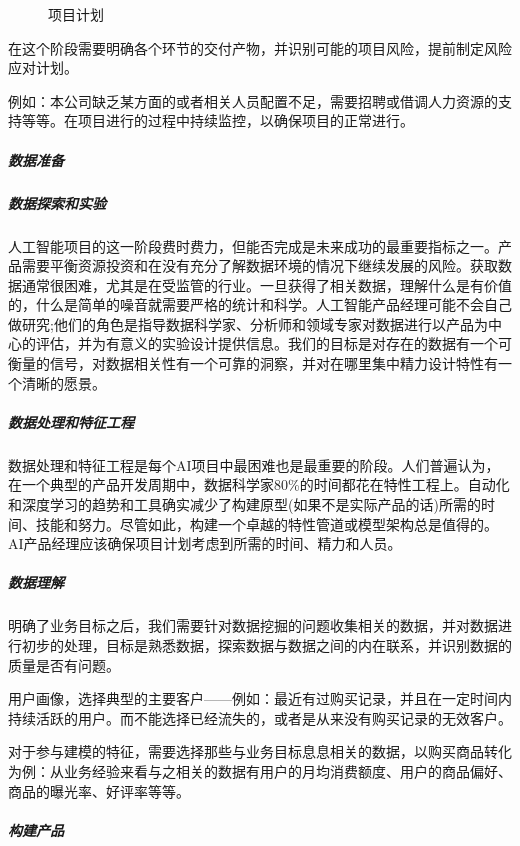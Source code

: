 \documentclass[letterpaper,11pt,english]{sphinxmanual}
\begin{document}
\begin{figure}[H]
\centering
\capstart

\noindent{}
\caption{项目计划}\label{\detokenize{chapter_project/process:id37}}\end{figure}

在这个阶段需要明确各个环节的交付产物，并识别可能的项目风险，提前制定风险应对计划。

例如：本公司缺乏某方面的或者相关人员配置不足，需要招聘或借调人力资源的支持等等。在项目进行的过程中持续监控，以确保项目的正常进行。


\subparagraph{数据准备}
\label{\detokenize{chapter_project/process:id18}}

\subparagraph{数据探索和实验}
\label{\detokenize{chapter_project/process:id19}}
人工智能项目的这一阶段费时费力，但能否完成是未来成功的最重要指标之一。产品需要平衡资源投资和在没有充分了解数据环境的情况下继续发展的风险。获取数据通常很困难，尤其是在受监管的行业。一旦获得了相关数据，理解什么是有价值的，什么是简单的噪音就需要严格的统计和科学。人工智能产品经理可能不会自己做研究;他们的角色是指导数据科学家、分析师和领域专家对数据进行以产品为中心的评估，并为有意义的实验设计提供信息。我们的目标是对存在的数据有一个可衡量的信号，对数据相关性有一个可靠的洞察，并对在哪里集中精力设计特性有一个清晰的愿景。


\subparagraph{数据处理和特征工程}
\label{\detokenize{chapter_project/process:id20}}
数据处理和特征工程是每个AI项目中最困难也是最重要的阶段。人们普遍认为，在一个典型的产品开发周期中，数据科学家80\%的时间都花在特性工程上。自动化和深度学习的趋势和工具确实减少了构建原型(如果不是实际产品的话)所需的时间、技能和努力。尽管如此，构建一个卓越的特性管道或模型架构总是值得的。AI产品经理应该确保项目计划考虑到所需的时间、精力和人员。


\subparagraph{数据理解}
\label{\detokenize{chapter_project/process:id21}}
明确了业务目标之后，我们需要针对数据挖掘的问题收集相关的数据，并对数据进行初步的处理，目标是熟悉数据，探索数据与数据之间的内在联系，并识别数据的质量是否有问题。

用户画像，选择典型的主要客户——例如：最近有过购买记录，并且在一定时间内持续活跃的用户。而不能选择已经流失的，或者是从来没有购买记录的无效客户。

对于参与建模的特征，需要选择那些与业务目标息息相关的数据，以购买商品转化为例：从业务经验来看与之相关的数据有用户的月均消费额度、用户的商品偏好、商品的曝光率、好评率等等。


\subparagraph{构建产品}
\label{\detokenize{chapter_project/process:id22}}
\end{document}
